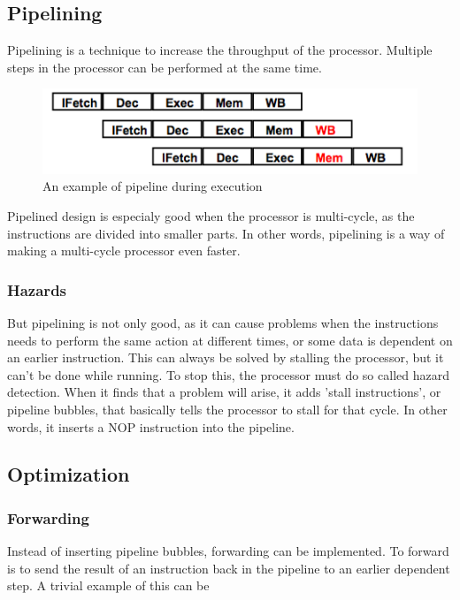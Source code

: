 \subsection{Pipelining}

Pipelining is a technique to increase the throughput of the processor. Multiple
steps in the processor can be performed at the same time. 

\begin{figure}[ht]
    \centering
    \includegraphics[scale=0.7]{figures/pipeline.png}
    \caption{\label{fig:pipeline}An example of pipeline during execution} 
\end{figure}

Pipelined design is especialy good when the processor is multi-cycle, as the
instructions are divided into smaller parts. In other words, pipelining is a way
of making a multi-cycle processor even faster. 

\subsubsection*{Hazards}
But pipelining is not only good, as it can cause problems when the instructions
needs to perform the same action at different times, or some data is dependent
on an earlier instruction. This can always be solved by stalling the processor, 
but it can't be done while running. To stop this, the processor must do so called 
hazard detection. When it finds that a problem will arise, it adds 'stall 
instructions', or pipeline bubbles, that basically tells the processor to stall 
for that cycle. In other words, it inserts a NOP instruction into the pipeline.

\subsection{Optimization}

\subsubsection*{Forwarding}
Instead of inserting pipeline bubbles, forwarding can be implemented. To forward
is to send the result of an instruction back in the pipeline to an earlier
dependent step. A trivial example of this can be

